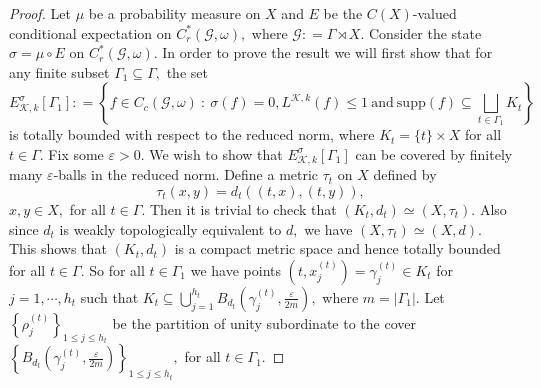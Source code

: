 \documentclass[a4paper,11pt,reqno]{amsart}
\theoremstyle{plain}
\theoremstyle{mainthmstyle}
\theoremstyle{named}
\numberwithin{equation}{section}
\begin{document}
\begin{proof}
Let $\mu$ be a probability measure on $X$ and $E$ be the $C (X)$-valued conditional expectation on $C_r^{\ast} (\mathcal G, \omega),$ where $\mathcal G : = \Gamma \rtimes X.$ Consider the state $\sigma = \mu \circ E$ on $C_r^{\ast} (\mathcal G, \omega).$ In order to prove the result we will first show that for any finite subset $\Gamma_1 \subseteq \Gamma,$ the set $$E_{\mathcal K, k}^{\sigma} [\Gamma_1] : = \left \{f \in C_c (\mathcal G, \omega)\ :\ \sigma (f) = 0, L^{\mathcal K, k} (f) \leq 1\ \mathrm{and}\ \mathrm{supp} (f) \subseteq \bigsqcup\limits_{t \in \Gamma_1} K_t \right \}$$ is totally bounded with respect to the reduced norm, where $K_t = \{t\} \times X$ for all $t \in \Gamma.$ Fix some $\varepsilon > 0.$ We wish to show that $E_{\mathcal K, k}^{\sigma} [\Gamma_1]$ can be covered by finitely many $\varepsilon$-balls in the reduced norm. Define a metric $\tau_t$ on $X$ defined by $$\tau_t (x, y) = d_t ((t, x), (t, y)),$$ $x, y \in X,$ for all $t \in \Gamma.$ Then it is trivial to check that $\left (K_t, d_t \right ) \simeq \left (X, \tau_t \right ).$ Also since $d_t$ is weakly topologically equivalent to $d,$ we have $\left (X, \tau_t \right ) \simeq (X, d).$ This shows that $\left (K_t, d_t \right )$ is a compact metric space and hence totally bounded for all $t \in \Gamma.$ So for all $t \in \Gamma_1$ we have points $\left (t, x_{j}^{(t)} \right ) = \gamma_j^{(t)} \in K_t$ for $j = 1, \cdots, h_t$ such that $K_t \subseteq \bigcup\limits_{j = 1}^{h_t} B_{d_t} \left (\gamma_j^{(t)}, \frac {\varepsilon} {2 m} \right ),$ where $m = \left \lvert \Gamma_1 \right \rvert.$ Let $\left \{\rho_{j}^{(t)} \right \}_{1 \leq j \leq h_t}$ be the partition of unity subordinate to the cover $\left \{B_{d_t} \left (\gamma_{j}^{(t)}, \frac {\varepsilon} {2 m} \right ) \right \}_{1 \leq j \leq h_t},$ for all $t \in \Gamma_1.$ %


\end{proof}
\end{document}

